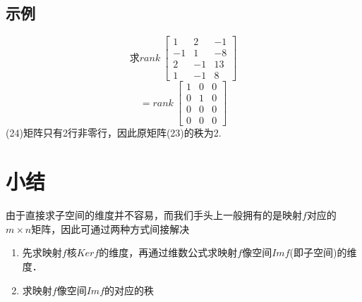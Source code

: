 \documentclass[12pt]{article}
\begin{document}
\begin{CJK}{UTF8}{gbsn}
\subsection{示例}
\begin{equation}
\text{求}rank\ \left[
\begin{array}{ccc}
1 & 2 & -1\\
-1 & 1 & -8\\
2 & -1 & 13\\
1 & -1 & 8
\end{array}
\right]
\end{equation}
\begin{equation}
=rank\ \left[
\begin{array}{ccc}
1 & 0 & 0\\
0 & 1 & 0\\
0 & 0 & 0\\
0 & 0 & 0
\end{array}
\right]
\end{equation}
(24)矩阵只有2行非零行，因此原矩阵(23)的秩为2.

\section{小结}
由于直接求子空间的维度并不容易，而我们手头上一般拥有的是映射$f$对应的$m \times n$矩阵，因此可通过两种方式间接解决
\begin{enumerate}
\item 先求映射$f$核$Kerf$的维度，再通过维数公式求映射$f$像空间$Imf$(即子空间)的维度．
\item 求映射$f$像空间$Imf$的对应的秩
\end{enumerate}

\end{CJK}
\end{document}
